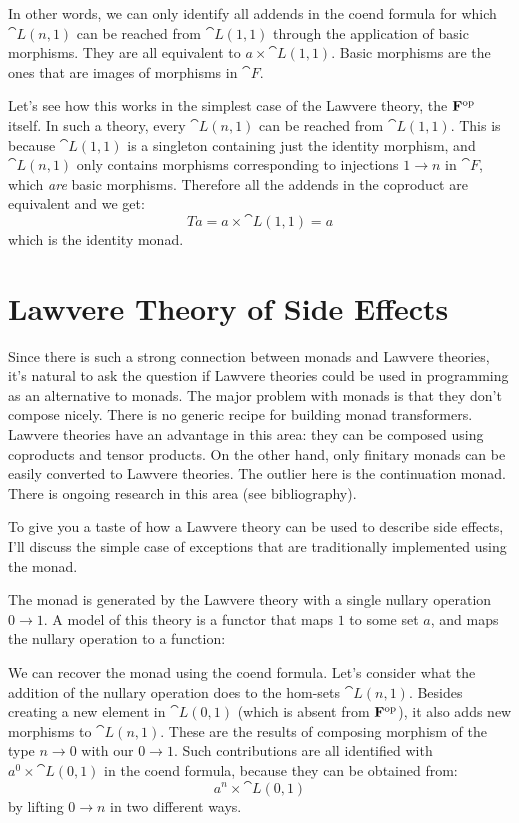 In other words, we can only identify all addends in the coend formula
for which $\cat{L}(n, 1)$ can be reached from $\cat{L}(1, 1)$
through the application of basic morphisms. They are all equivalent to
$a \times \cat{L}(1, 1)$. Basic morphisms are the ones that are images of
morphisms in $\cat{F}$.

Let's see how this works in the simplest case of the Lawvere theory, the
$\mathbf{F}^{\mathrm{op}}$ itself. In such a theory, every
$\cat{L}(n, 1)$ can be reached from $\cat{L}(1, 1)$. This is because
$\cat{L}(1, 1)$ is a singleton containing just the identity morphism,
and $\cat{L}(n, 1)$ only contains morphisms corresponding to
injections $1 \to n$ in $\cat{F}$, which \emph{are}
basic morphisms. Therefore all the addends in the coproduct are
equivalent and we get:
\[T a = a \times \cat{L}(1, 1) = a\]
which is the identity monad.

\section{Lawvere Theory of Side Effects}

Since there is such a strong connection between monads and Lawvere
theories, it's natural to ask the question if Lawvere theories could be
used in programming as an alternative to monads. The major problem with
monads is that they don't compose nicely. There is no generic recipe for
building monad transformers. Lawvere theories have an advantage in this
area: they can be composed using coproducts and tensor products. On the
other hand, only finitary monads can be easily converted to Lawvere
theories. The outlier here is the continuation monad. There is ongoing
research in this area (see bibliography).

To give you a taste of how a Lawvere theory can be used to describe side
effects, I'll discuss the simple case of exceptions that are
traditionally implemented using the  monad.

The  monad is generated by the Lawvere theory with a
single nullary operation $0 \to 1$. A model of this
theory is a functor that maps $1$ to some set $a$, and
maps the nullary operation to a function:

We can recover the  monad using the coend formula. Let's
consider what the addition of the nullary operation does to the hom-sets
$\cat{L}(n, 1)$. Besides creating a new element in $\cat{L}(0, 1)$ (which is
absent from $\mathbf{F}^{\mathrm{op}}$), it also adds new morphisms
to $\cat{L}(n, 1)$. These are the results of composing morphism of the
type $n \to 0$ with our $0 \to 1$.
Such contributions are all identified with $a^0 \times \cat{L}(0, 1)$ in
the coend formula, because they can be obtained from:
\[a^n \times \cat{L}(0, 1)\]
by lifting $0 \to n$ in two different ways.

